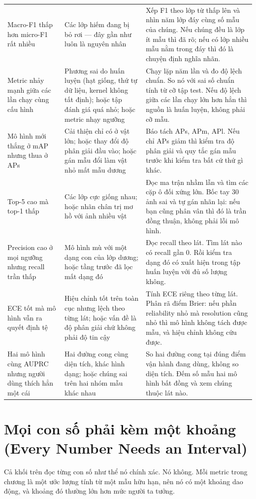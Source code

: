 \documentclass[../../deep_learning.tex]{subfiles}
\begin{document}
\begin{longtable}{@{}L{3.35cm}L{5.55cm}L{6.3cm}@{}}
Macro-F1 thấp hơn micro-F1 rất nhiều
& Các lớp hiếm đang bị bỏ rơi --- đây gần như luôn là nguyên nhân
& Xếp F1 theo lớp từ thấp lên và nhìn năm lớp đáy cùng số mẫu của chúng. Nếu chúng đều là lớp ít mẫu thì đã rõ; nếu có lớp nhiều mẫu nằm trong đáy thì đó là chuyện định nghĩa nhãn.\\
Metric nhảy mạnh giữa các lần chạy cùng cấu hình
& Phương sai do huấn luyện (hạt giống, thứ tự dữ liệu, kernel không tất định); hoặc tập đánh giá quá nhỏ; hoặc metric nhạy ngưỡng
& Chạy lặp năm lần và đo độ lệch chuẩn. So nó với sai số chuẩn tính từ cỡ tập test. Nếu độ lệch giữa các lần chạy lớn hơn hẳn thì nguồn là huấn luyện, không phải cỡ mẫu.\\
Mô hình mới thắng ở mAP nhưng thua ở APs
& Cải thiện chỉ có ở vật lớn; hoặc thay đổi độ phân giải đầu vào; hoặc gán mẫu đổi làm vật nhỏ mất mẫu dương
& Báo tách APs, APm, APl. Nếu chỉ APs giảm thì kiểm tra độ phân giải và quy tắc gán mẫu trước khi kiểm tra bất cứ thứ gì khác.\\
Top-5 cao mà top-1 thấp
& Các lớp cực giống nhau; hoặc nhãn chân trị mơ hồ với ảnh nhiều vật
& Đọc ma trận nhầm lẫn và tìm các cặp ô đối xứng lớn. Bốc tay 30 ảnh sai và tự gán nhãn lại: nếu bạn cũng phân vân thì đó là trần đồng thuận, không phải lỗi mô hình.\\
Precision cao ở mọi ngưỡng nhưng recall trần thấp
& Mô hình mù với một dạng con của lớp dương; hoặc tầng trước đã lọc mất dạng đó
& Đọc recall theo lát. Tìm lát nào có recall gần 0. Rồi kiểm tra dạng đó có xuất hiện trong tập huấn luyện với đủ số lượng không.\\
ECE tốt mà mô hình vẫn ra quyết định tệ
& Hiệu chỉnh tốt trên toàn cục nhưng lệch theo từng lát; hoặc vấn đề là độ phân giải chứ không phải độ tin cậy
& Tính ECE riêng theo từng lát. Phân rã điểm Brier: nếu phần reliability nhỏ mà resolution cũng nhỏ thì mô hình không tách được mẫu, và hiệu chỉnh không cứu được.\\
Hai mô hình cùng AUPRC nhưng người dùng thích hẳn một cái
& Hai đường cong cùng diện tích, khác hình dạng; hoặc chúng sai trên hai nhóm mẫu khác nhau
& So hai đường cong tại đúng điểm vận hành đang dùng, không so diện tích. Đếm số mẫu hai mô hình bất đồng và xem chúng thuộc lát nào.\\
\end{longtable}
\normalsize

\section{Mọi con số phải kèm một khoảng (Every Number Needs an Interval)}
Cả khối trên đọc từng con số như thể nó chính xác. Nó không. Mỗi metric trong chương là một ước lượng tính từ một mẫu hữu hạn, nên nó có một khoảng dao động, và khoảng đó thường lớn hơn mức người ta tưởng.
\end{document}
